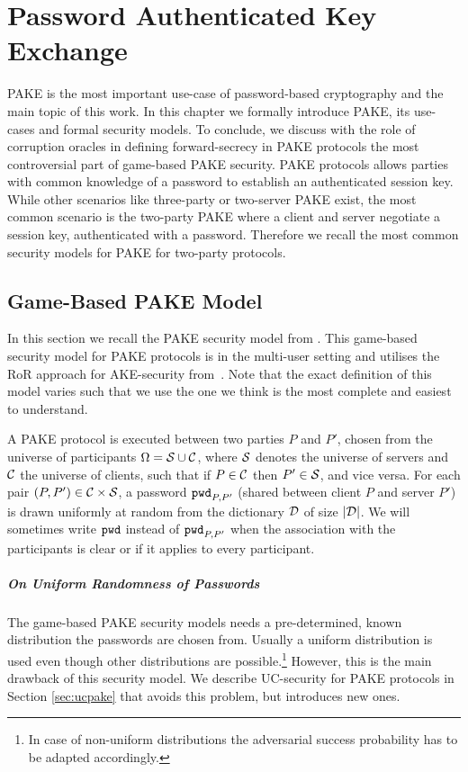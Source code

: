 \chapter{Password Authenticated Key Exchange}\label{ch:pake}
\acl{PAKE} is the most important use-case of password-based cryptography and the main topic of this work.
In this chapter we formally introduce \ac{PAKE}, its use-cases and formal security models.
To conclude, we discuss with the role of corruption oracles in defining forward-secrecy in \ac{PAKE} protocols the most controversial part of game-based \ac{PAKE} security.
\ac{PAKE} protocols allows parties with common knowledge of a password to establish an authenticated session key.
While other scenarios like three-party or two-server \ac{PAKE} exist, the most common scenario is the two-party \ac{PAKE} where a client and server negotiate a session key, authenticated with a password.
Therefore we recall the most common security models for \ac{PAKE} for two-party protocols.

\section{Game-Based PAKE Model} \label{sec:gamebasedpake} %
In this section we recall the \ac{PAKE} security model from \cite{Abdalla2005}.
This game-based security model for \ac{PAKE} protocols is in the multi-user setting and utilises the \acl{RoR} approach for \ac{AKE}-security from~\cite{Abdalla2005,Bellare2000}.
Note that the exact definition of this model varies such that we use the one we think is the most complete and easiest to understand.

A \ac{PAKE} protocol is executed between two parties $P$ and $P'$, chosen from the universe of participants $\Omega=\mathcal{S}\cup\mathcal{C}$, where $\mathcal{S}$ denotes the universe of servers and $\mathcal{C}$ the universe of clients, such that if $P\in\mathcal{C}$ then $P'\in\mathcal{S}$, and vice versa.
For each pair $(P,P')\in\mathcal{C}\times\mathcal{S}$, a password $\mathtt{pwd}_{P,P'}$ (shared between client $P$ and server $P'$) is drawn uniformly at random from the dictionary $\mathcal{D}$ of size $|\mathcal{D}|$.
We will sometimes write $\mathtt{pwd}$ instead of $\mathtt{pwd}_{P,P'}$ when the association with the participants is clear or if it applies to every participant.

\paragraph{On Uniform Randomness of Passwords}
The game-based \ac{PAKE} security models needs a pre-determined, known distribution the passwords are chosen from.
Usually a uniform distribution is used even though other distributions are possible.\footnote{In case of non-uniform distributions the adversarial success probability has to be adapted accordingly.}
However, this is the main drawback of this security model.
We describe \ac{UC}-security for \ac{PAKE} protocols in Section \ref{sec:ucpake} that avoids this problem, but introduces new ones.

